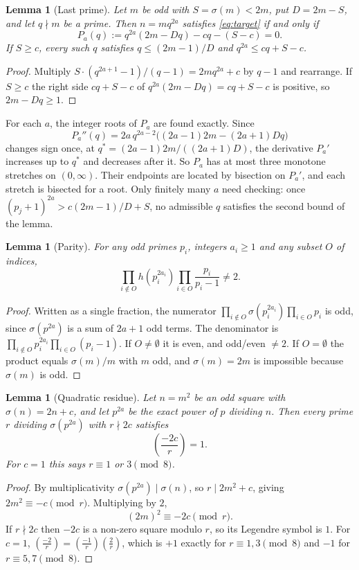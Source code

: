 \documentclass[11pt]{amsart}
\newtheorem{lemma}[theorem]{Lemma}
\theoremstyle{remark}
\begin{document}
\begin{lemma}[Last prime]\label{lem:lastprime}
Let $m$ be odd with $S = \sigma(m) < 2m$, put $D = 2m - S$, and let $q \nmid m$
be a prime. Then $n = m q^{2a}$ satisfies \eqref{eq:target} if and only if
\begin{equation}\label{eq:lastprime}
  P_a(q) := q^{2a}(2m - Dq) - cq - (S - c) = 0 .
\end{equation}
If $S \ge c$, every such $q$ satisfies $q \le (2m-1)/D$ and
$q^{2a} \le cq + S - c$.
\end{lemma}
\begin{proof}
Multiply $S \cdot (q^{2a+1} - 1)/(q - 1) = 2mq^{2a} + c$ by $q - 1$ and
rearrange. If $S \ge c$ the right side $cq + S - c$ of
$q^{2a}(2m - Dq) = cq + S - c$ is positive, so $2m - Dq \ge 1$.
\end{proof}

For each $a$, the integer roots of $P_a$ are found exactly. Since
\[
  P_a''(q) = 2a\,q^{2a-2}\bigl((2a-1)2m - (2a+1)Dq\bigr)
\]
changes sign once, at $q^* = (2a-1)2m/((2a+1)D)$, the derivative $P_a'$
increases up to $q^*$ and decreases after it. So $P_a$ has at most three
monotone stretches on $(0,\infty)$. Their endpoints are located by bisection
on $P_a'$, and each stretch is bisected for a root. Only finitely many $a$ need
checking: once $(p_j + 1)^{2a} > c(2m-1)/D + S$, no admissible $q$ satisfies
the second bound of the lemma.

\begin{lemma}[Parity]\label{lem:parity}
For any odd primes $p_i$, integers $a_i \ge 1$ and any subset $O$ of indices,
\[
  \prod_{i \notin O} h(p_i^{2a_i}) \prod_{i \in O} \frac{p_i}{p_i - 1} \ne 2 .
\]
\end{lemma}
\begin{proof}
Written as a single fraction, the numerator
$\prod_{i\notin O}\sigma(p_i^{2a_i})\prod_{i\in O}p_i$ is odd, since
$\sigma(p^{2a})$ is a sum of $2a+1$ odd terms. The denominator is
$\prod_{i \notin O} p_i^{2a_i} \prod_{i\in O}(p_i - 1)$. If $O \ne \emptyset$
it is even, and odd/even $\ne 2$. If $O = \emptyset$ the product equals
$\sigma(m)/m$ with $m$ odd, and $\sigma(m) = 2m$ is impossible because
$\sigma(m)$ is odd.
\end{proof}

\begin{lemma}[Quadratic residue]\label{lem:qr}
Let $n = m^{2}$ be an odd square with $\sigma(n) = 2n + c$, and let $p^{2a}$ be
the exact power of $p$ dividing $n$. Then every prime $r$ dividing
$\sigma(p^{2a})$ with $r \nmid 2c$ satisfies
\[
  \left(\frac{-2c}{r}\right) = 1 .
\]
For $c = 1$ this says $r \equiv 1$ or $3 \pmod 8$.
\end{lemma}
\begin{proof}
By multiplicativity $\sigma(p^{2a}) \mid \sigma(n)$, so
$r \mid 2m^{2} + c$, giving $2m^{2} \equiv -c \pmod r$. Multiplying by $2$,
\[
  (2m)^{2} \equiv -2c \pmod r .
\]
If $r \nmid 2c$ then $-2c$ is a non-zero square modulo $r$, so its Legendre
symbol is $1$. For $c = 1$,
$\left(\frac{-2}{r}\right) = \left(\frac{-1}{r}\right)\left(\frac{2}{r}\right)$,
which is $+1$ exactly for $r \equiv 1, 3 \pmod 8$ and $-1$ for
$r \equiv 5, 7 \pmod 8$.
\end{proof}
\end{document}
